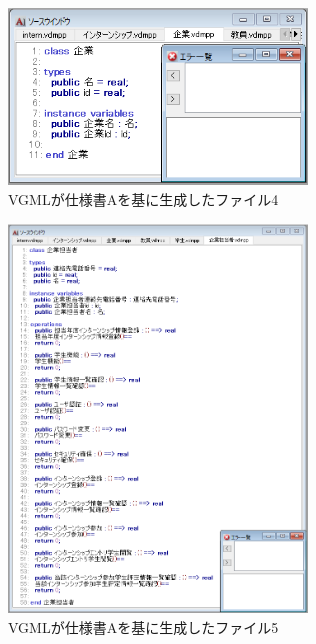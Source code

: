 \begin{figure}[tp]
    \begin{center}
    \includegraphics[width=300]{image/indication_vdm4.PNG}
    \caption{VGMLが仕様書Aを基に生成したファイル4}
    \label{fig:indication_vdm4}
    \end{center}
\end{figure}

\begin{figure}[tp]
    \begin{center}
    \includegraphics[width=300]{image/indication_vdm5.PNG}
    \caption{VGMLが仕様書Aを基に生成したファイル5}
    \label{fig:indication_vdm1}
    \end{center}
\end{figure}

